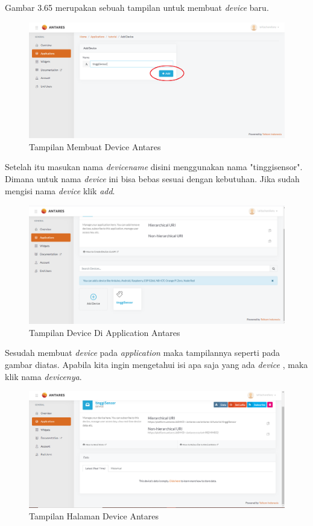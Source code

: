 \begin{enumerate}
    \par Gambar 3.65 merupakan sebuah tampilan untuk membuat \textit{device} baru.
    \begin{figure}[H]
    \centering
    \includegraphics[width=1\textwidth]{figures/project6.png}
    \caption{Tampilan Membuat Device Antares}
    \label{print}
    \end{figure}
    \par Setelah itu masukan nama \textit{devicename} disini menggunakan nama "tinggisensor". Dimana untuk nama \textit{device} ini bisa bebas sesuai dengan kebutuhan. Jika sudah mengisi nama \textit{device} klik \textit{add}.
     \begin{figure}[H]
    \centering
    \includegraphics[width=1\textwidth]{figures/project7.png}
    \caption{Tampilan Device Di Application Antares}
    \label{print}
    \end{figure}
    
    \par Sesudah membuat \textit{device} pada \textit{application} maka tampilannya seperti pada gambar diatas. Apabila kita ingin mengetahui isi apa saja yang ada \textit{device} , maka klik nama \textit{devicenya}.
     \begin{figure}[H]
    \centering
    \includegraphics[width=1\textwidth]{figures/project8.png}
    \caption{Tampilan Halaman Device Antares}
    \label{print}
    \end{figure}
    

\end{enumerate}
